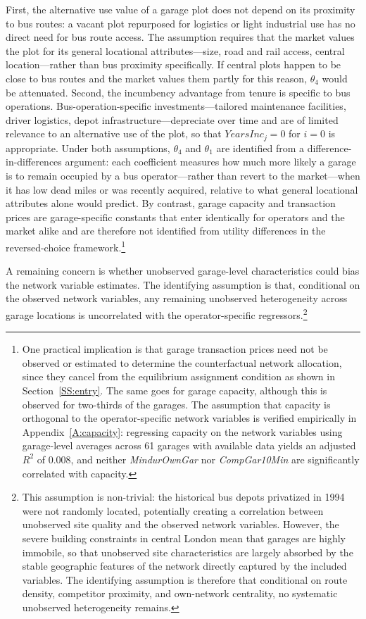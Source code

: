 \documentclass[12pt]{article}
\begin{document}
First, the alternative use value of a garage plot does not depend on its 
proximity to bus routes: a vacant plot repurposed for logistics or light 
industrial use has no direct need for bus route access. The assumption 
requires that the market values the plot for its general locational 
attributes---size, road and rail access, central location---rather than 
bus proximity specifically. If central plots happen to be close to bus routes 
and the market values them partly for this reason, $\theta_4$ would be 
attenuated. Second, the incumbency advantage from tenure is specific to bus 
operations. Bus-operation-specific investments---tailored maintenance 
facilities, driver logistics, depot infrastructure---depreciate over time 
and are of limited relevance to an alternative use of the plot, so that 
$\textit{YearsInc}_j = 0$ for $i=0$ is appropriate. Under both assumptions, 
$\theta_4$ and $\theta_1$ are identified from a difference-in-differences 
argument: each coefficient measures how much more likely a garage is to 
remain occupied by a bus operator---rather than revert to the market---when 
it has low dead miles or was recently acquired, relative to what general 
locational attributes alone would predict. By contrast, garage capacity and transaction prices are garage-specific constants that 
enter identically for operators and the market alike and are therefore not identified from utility 
differences in the reversed-choice framework.\footnote{One practical implication is that garage 
transaction prices need not be observed or estimated to determine the 
counterfactual network allocation, since they cancel from the equilibrium 
assignment condition as shown in Section~\ref{SS:entry}. The same goes for garage capacity, although this is observed for two-thirds of the garages. The assumption that capacity is orthogonal to the operator-specific network 
variables is verified empirically in Appendix~\ref{A:capacity}: regressing 
capacity on the network variables using garage-level averages across 61 
garages with available data yields an adjusted $R^2$ of 0.008, and neither 
\textit{MindurOwnGar} nor \textit{CompGar10Min} are significantly 
correlated with capacity.}

A remaining concern is whether unobserved garage-level characteristics could 
bias the network variable estimates. The identifying assumption is that, 
conditional on the observed network variables, any remaining unobserved 
heterogeneity across garage locations is uncorrelated with the 
operator-specific regressors.\footnote{This assumption is non-trivial: 
the historical bus depots privatized in 1994 were not randomly located, 
potentially creating a correlation between unobserved site quality and 
the observed network variables. However, the severe building constraints 
in central London mean that garages are highly immobile, so that unobserved 
site characteristics are largely absorbed by the stable geographic features 
of the network directly captured by the included variables. The identifying 
assumption is therefore that conditional on route density, competitor 
proximity, and own-network centrality, no systematic unobserved 
heterogeneity remains.}
\end{document}
